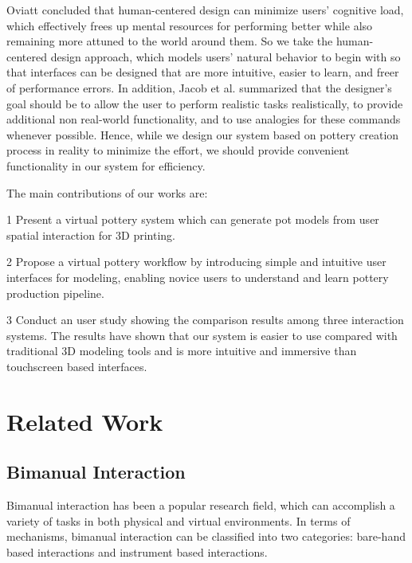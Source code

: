 Oviatt \cite{oviatt2006human} concluded that human-centered design can minimize users’ cognitive load, which effectively frees up mental resources for performing better while also remaining more attuned to the world around them.
So we take the human-centered design approach, which models users’ natural behavior to begin with so that interfaces can be designed that are more intuitive, easier to learn, and freer of performance errors.
In addition, Jacob et al. \cite{Jacob2008Reality} summarized that the designer's goal should be to allow the user to perform realistic tasks realistically, to provide additional non real-world functionality, and to use analogies for these commands whenever possible.
Hence, while we design our system based on pottery creation process in reality to minimize the effort, we should provide convenient functionality in our system for efficiency.

The main contributions of our works are:

1 Present a virtual pottery system which can generate pot models from user spatial interaction for 3D printing.

2 Propose a virtual pottery workflow by introducing simple and intuitive user interfaces for modeling, enabling novice users to understand and learn pottery production pipeline.

3 Conduct an user study showing the comparison results among three interaction systems. The results have shown that our system is easier to use compared with traditional 3D modeling tools and is more intuitive and immersive than touchscreen based interfaces.


\section{Related Work}
\label{sec:2}

\subsection{Bimanual Interaction}
\label{sec:2.1}
Bimanual interaction has been a popular research field, which can accomplish a variety of tasks in both physical and virtual environments.
In terms of mechanisms, bimanual interaction can be classified into two categories: bare-hand based interactions and instrument based interactions.

